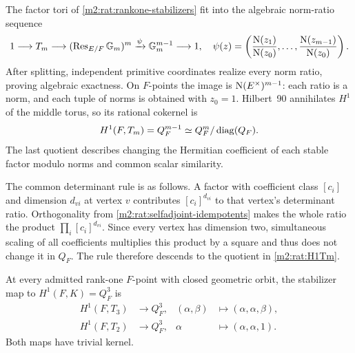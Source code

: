 The factor tori of \cref{m2:rat:rankone-stabilizers} fit into the
algebraic norm-ratio sequence
\begin{equation}\label{m2:rat:Tm-sequence}
 1\longrightarrow T_m\longrightarrow(\operatorname{Res}_{E/F}\mathbb G_m)^m
 \xrightarrow{\psi}\mathbb G_m^{m-1}\longrightarrow1,
 \quad\psi(z)=\left(\frac{\operatorname{N}(z_1)}{\operatorname{N}(z_0)},\ldots,
                    \frac{\operatorname{N}(z_{m-1})}{\operatorname{N}(z_0)}\right).
\end{equation}
After splitting, independent primitive coordinates realize
every norm ratio, proving algebraic exactness. On $F$-points
the image is $\operatorname{N}(E^\times)^{m-1}$: each ratio is a norm, and
each tuple of norms is obtained with $z_0=1$. Hilbert~90
annihilates $H^1$ of the middle torus, so its rational cokernel is
\begin{equation}\label{m2:rat:H1Tm}
 H^1(F,T_m)=Q_F^{m-1}\simeq Q_F^m/\operatorname{diag}(Q_F).
\end{equation}
The last quotient describes changing the Hermitian coefficient
of each stable factor modulo norms and common scalar similarity.

The common determinant rule is as follows. A factor with
coefficient class $[c_i]$ and dimension $d_{vi}$ at vertex $v$
contributes $[c_i]^{d_{vi}}$ to that vertex's determinant ratio.
Orthogonality from \cref{m2:rat:selfadjoint-idempotents} makes the
whole ratio the product $\prod_i[c_i]^{d_{vi}}$.
Since every vertex has dimension two, simultaneous scaling of
all coefficients multiplies this product by a square and thus
does not change it in $Q_F$. The rule therefore descends to
the quotient in \eqref{m2:rat:H1Tm}.

\begin{proposition}
\label{m2:rat:rankone-kernel}
At every admitted rank-one $F$-point with closed geometric
orbit, the stabilizer map to $H^1(F,K)=Q_F^3$ is
\begin{align}
 H^1(F,T_3)&\longrightarrow Q_F^3,&
 (\alpha,\beta)&\longmapsto(\alpha,\alpha,\beta),
       \label{m2:rat:T3-H1}\\
 H^1(F,T_2)&\longrightarrow Q_F^3,&
 \alpha&\longmapsto(\alpha,\alpha,1).
       \label{m2:rat:T2-H1}
\end{align}
Both maps have trivial kernel.
\end{proposition}

